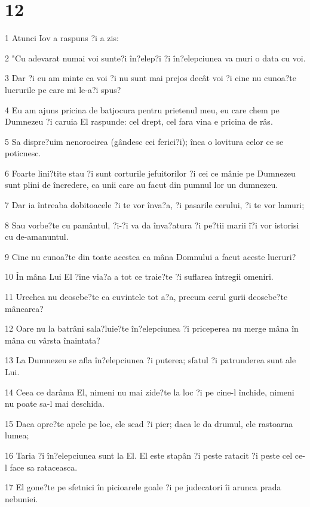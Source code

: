\chapter{12}

\par 1 Atunci Iov a raspuns ?i a zis:
\par 2 "Cu adevarat numai voi sunte?i în?elep?i ?i în?elepciunea va muri o data cu voi.
\par 3 Dar ?i eu am minte ca voi ?i nu sunt mai prejos decât voi ?i cine nu cunoa?te lucrurile pe care mi le-a?i spus?
\par 4 Eu am ajuns pricina de batjocura pentru prietenul meu, eu care chem pe Dumnezeu ?i caruia El raspunde: cel drept, cel fara vina e pricina de râs.
\par 5 Sa dispre?uim nenorocirea (gândesc cei ferici?i); înca o lovitura celor ce se poticnesc.
\par 6 Foarte lini?tite stau ?i sunt corturile jefuitorilor ?i cei ce mânie pe Dumnezeu sunt plini de încredere, ca unii care au facut din pumnul lor un dumnezeu.
\par 7 Dar ia întreaba dobitoacele ?i te vor înva?a, ?i pasarile cerului, ?i te vor lamuri;
\par 8 Sau vorbe?te cu pamântul, ?i-?i va da înva?atura ?i pe?tii marii î?i vor istorisi cu de-amanuntul.
\par 9 Cine nu cunoa?te din toate acestea ca mâna Domnului a facut aceste lucruri?
\par 10 În mâna Lui El ?ine via?a a tot ce traie?te ?i suflarea întregii omeniri.
\par 11 Urechea nu deosebe?te ea cuvintele tot a?a, precum cerul gurii deosebe?te mâncarea?
\par 12 Oare nu la batrâni sala?luie?te în?elepciunea ?i priceperea nu merge mâna în mâna cu vârsta înaintata?
\par 13 La Dumnezeu se afla în?elepciunea ?i puterea; sfatul ?i patrunderea sunt ale Lui.
\par 14 Ceea ce darâma El, nimeni nu mai zide?te la loc ?i pe cine-l închide, nimeni nu poate sa-l mai deschida.
\par 15 Daca opre?te apele pe loc, ele scad ?i pier; daca le da drumul, ele rastoarna lumea;
\par 16 Taria ?i în?elepciunea sunt la El. El este stapân ?i peste ratacit ?i peste cel ce-l face sa rataceasca.
\par 17 El gone?te pe sfetnici în picioarele goale ?i pe judecatori îi arunca prada nebuniei.
